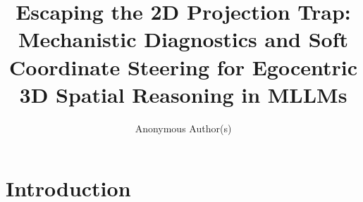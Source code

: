 \documentclass[runningheads]{llncs}
\begin{document}
%
\title{Escaping the 2D Projection Trap: Mechanistic Diagnostics and Soft Coordinate Steering for Egocentric 3D Spatial Reasoning in MLLMs}
%
%
\author{Anonymous Author(s)}
%
%
%
\maketitle              %
%
\section{Introduction}
\label{sec:intro}


%
%
%


\end{document}

